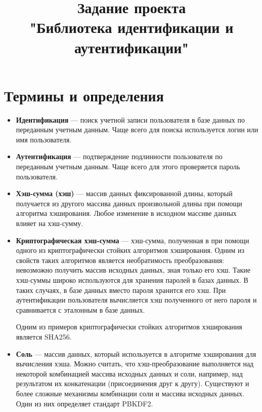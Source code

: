 \documentclass[14pt]{extarticle}
\title{Задание проекта \\ "Библиотека идентификации и аутентификации"}
\begin{document}
\maketitle

\tableofcontents

\clearpage

\section{Термины и определения}

\begin{itemize}

 \item \textbf{Идентификация} --- поиск учетной записи пользователя в базе
  данных по переданным учетным данным. 
  Чаще всего для поиска используется логин или имя пользователя.

 \item \textbf{Аутентификация} --- подтверждение подлинности пользователя
  по переданным учетным данным.
  Чаще всего для этого проверяется пароль пользователя.

 \item \textbf{Хэш-сумма (хэш)} --- массив данных фиксированной длины, который
  получается из другого массива данных произвольной длины при помощи алгоритма
  хэширования.
  Любое изменение в исходном массиве данных влияет на хэш-сумму.

 \item \textbf{Криптографическая хэш-сумма} --- хэш-сумма, полученная в
  при помощи одного из криптографически стойких алгоритмов хэширования.
  Одним из свойств таких алгоритмов является необратимость преобразования:
  невозможно получить массив исходных данных, зная только его хэш.
  Такие хэш-суммы широко используются для хранения паролей в базах данных.
  В таких случаях, в базе данных вместо пароля хранится его хэш.
  При аутентификации пользователя вычисляется хэш полученного от него пароля
  и сравнивается с эталонным в базе данных.

  Одним из примеров криптографически стойких алгоритмов хэширования является
  SHA256\footnotemark{}.


 \item \textbf{Соль} --- массив данных, который используется в
  алгоритме хэширования для вычисления хэша.
  Можно считать, что хэш-преобразование выполняется над некоторой комбинацией
  массива исходных данных и соли, например, над результатом их конкатенации
  (присоединения друг к другу).
  Существуют и более сложные механизмы комбинации соли и массива исходных
  данных.
  Один из них определяет стандарт PBKDF2\footnotemark{}.


\end{itemize}
\end{document}
